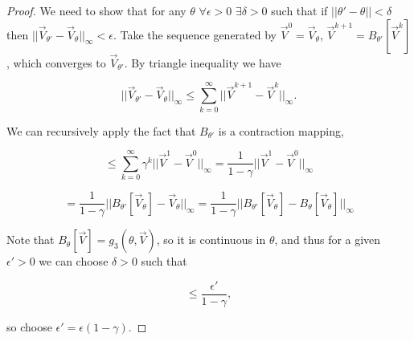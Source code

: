 \documentclass[letterpaper, 10 pt, conference]{ieeeconf}
\begin{document}
\begin{proof}
We need to show that for any $\theta$ $\forall \epsilon>0$ $\exists \delta>0$ such that if $||\theta'-\theta|| < \delta$ then $||\vec{V}_{\theta'} - \vec{V}_{\theta}||_{\infty} < \epsilon$. Take the sequence generated by $\vec{V}^0=\vec{V}_{\theta}$,  $\vec{V}^{k+1}=B_{\theta'}[\vec{V}^{k}]$, which converges to $\vec{V}_{\theta'}$. By triangle inequality we have

\begin{equation*}
||\vec{V}_{\theta'} - \vec{V}_{\theta}||_{\infty} \leq \sum_{k=0}^{\infty}||\vec{V}^{k+1}-\vec{V}^{k}||_{\infty}.
\end{equation*}

\noindent We can recursively apply the fact that $B_{\theta'}$ is a contraction mapping, 

\begin{equation*}
\leq \sum_{k=0}^{\infty}\gamma^k||\vec{V}^{1}-\vec{V}^{0}||_{\infty} = \frac{1}{1-\gamma}||\vec{V}^{1}-\vec{V}^{0}||_{\infty}
\end{equation*} 

\begin{equation*}
=\frac{1}{1-\gamma}||B_{\theta'}[\vec{V}_{\theta}]-\vec{V}_{\theta}||_{\infty}=\frac{1}{1-\gamma}||B_{\theta'}[\vec{V}_{\theta}]-B_{\theta}[\vec{V}_{\theta}]||_{\infty}
\end{equation*}

\noindent Note that $B_{\theta}[\vec{V}]=g_3(\theta,\vec{V})$, so it is continuous in $\theta$, and thus for a given $\epsilon'>0$ we can choose $\delta>0$ such that 

\begin{equation}
\leq \frac{\epsilon'}{1-\gamma},
\end{equation}

\noindent so choose $\epsilon' = \epsilon (1-\gamma)$.

\end{proof}
\end{document}
